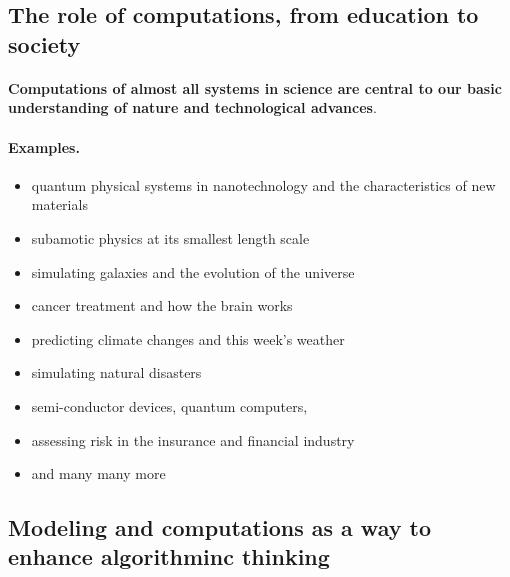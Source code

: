 \documentclass[%
oneside,                 %
final,                   %
10pt]{article}
\begin{document}
\noindent



\subsection{The role of computations, from education to society}

\paragraph{}
\textbf{Computations of almost all systems in science are central to our
basic understanding of nature and technological advances}.



\paragraph{Examples.}
\begin{itemize}
\item quantum physical systems in nanotechnology and the characteristics of new materials

\item subamotic physics at its smallest length scale

\item simulating galaxies and the evolution of the universe

\item cancer treatment and how the brain works

\item predicting climate changes and this week's weather

\item simulating natural disasters

\item semi-conductor devices, quantum computers,

\item assessing risk in the insurance and financial industry

\item and many many more
\end{itemize}

\noindent



\subsection{Modeling and computations as a way to enhance algorithminc thinking}
\end{document}

